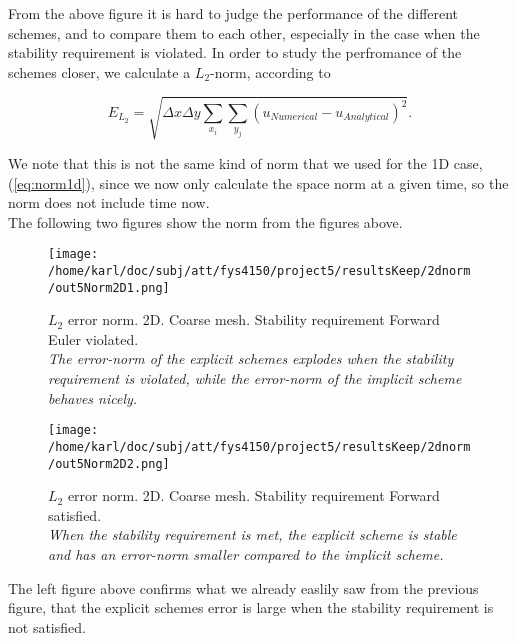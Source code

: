 \documentclass{article}
\begin{document}
From the above figure it is hard to judge the performance of the different schemes, and to compare them to each other, especially in the case when the stability requirement is violated. In order to study the perfromance of the schemes closer, we calculate a $L_2$-norm, according to

\begin{equation}\label{eq:ld2d}
	E_{L_2} = \sqrt{\Delta x \Delta y \sum_{x_i} \sum_{y_j} (u_{Numerical} - u_{Analytical})^2}.
\end{equation}

We note that this is not the same kind of norm that we used for the 1D case, (\ref{eq:norm1d}), since we now only calculate the space norm at a given time, so the norm does not include time now.\\

The following two figures show the norm from the figures above.

\begin{minipage}{.45\textwidth} 
	\begin{figure}[H]
		\centering
		\texttt{[image: /home/karl/doc/subj/att/fys4150/project5/resultsKeep/2dnorm/out5Norm2D1.png]}
		\caption{$L_2$ error norm. 2D. Coarse mesh. Stability requirement Forward Euler violated.\\ \textit{The error-norm of the explicit schemes explodes when the stability requirement is violated, while the error-norm of the implicit scheme behaves nicely.}}
		\label{fig:norm2d1}
	\end{figure}
\end{minipage}\hfill
\begin{minipage}{.45\textwidth} 
	\begin{figure}[H]
		\centering
		\texttt{[image: /home/karl/doc/subj/att/fys4150/project5/resultsKeep/2dnorm/out5Norm2D2.png]}
		\caption{$L_2$ error norm. 2D. Coarse mesh. Stability requirement Forward satisfied.\\ \textit{When the stability requirement is met, the explicit scheme is stable and has an error-norm smaller compared to the implicit scheme.}}
		\label{fig:norm2d2}
	\end{figure}
\end{minipage}\hfill
\vspace{2ex}

The left figure above confirms what we already easlily saw from the previous figure, that the explicit schemes error is large when the stability requirement is not satisfied.\\
\end{document}
